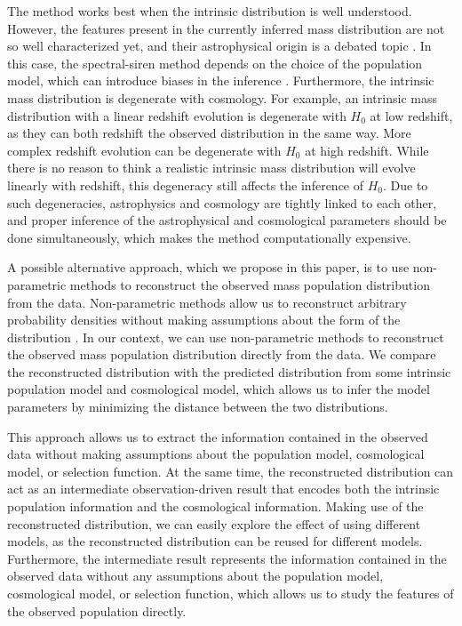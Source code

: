 \documentclass[sn-aps, pdflatex, iicol]{sn-jnl}
\begin{document}
The method works best when the intrinsic distribution is well understood.
However, the features present in the currently inferred mass distribution are not so well characterized yet, and their astrophysical origin is a debated topic \citep{Zevin:2017evb, Mapelli:2020vfa, Zevin:2020gbd, Mandel:2018hfr, Marchant:2023wno}.
In this case, the spectral-siren method depends on the choice of the population model, which can introduce biases in the inference \citep{Mastrogiovanni:2021wsd, Mukherjee:2021rtw, Pierra:2023deu}.
Furthermore, the intrinsic mass distribution is degenerate with cosmology.
For example, an intrinsic mass distribution with a linear redshift evolution is degenerate with $H_0$ at low redshift, as they can both redshift the observed distribution in the same way.
More complex redshift evolution can be degenerate with $H_0$ at high redshift.
While there is no reason to think a realistic intrinsic mass distribution will evolve linearly with redshift, this degeneracy still affects the inference of $H_0$.
Due to such degeneracies, astrophysics and cosmology are tightly linked to each other, and proper inference of the astrophysical and cosmological parameters should be done simultaneously, which makes the method computationally expensive.

A possible alternative approach, which we propose in this paper, is to use non-parametric methods to reconstruct the observed mass population distribution from the data.
Non-parametric methods allow us to reconstruct arbitrary probability densities without making assumptions about the form of the distribution \citep{Rinaldi:2021bhm}.
In our context, we can use non-parametric methods to reconstruct the observed mass population distribution directly from the data.
We compare the reconstructed distribution with the predicted distribution from some intrinsic population model and cosmological model, which allows us to infer the model parameters by minimizing the distance between the two distributions.

This approach allows us to extract the information contained in the observed data without making assumptions about the population model, cosmological model, or selection function.
At the same time, the reconstructed distribution can act as an intermediate observation-driven result that encodes both the intrinsic population information and the cosmological information.
Making use of the reconstructed distribution, we can easily explore the effect of using different models, as the reconstructed distribution can be reused for different models.
Furthermore, the intermediate result represents the information contained in the observed data without any assumptions about the population model, cosmological model, or selection function, which allows us to study the features of the observed population directly.
\end{document}
